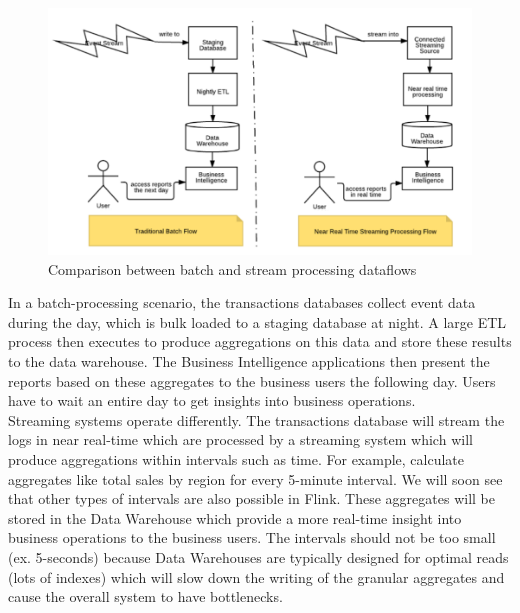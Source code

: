 				\begin{figure}[h!]
					\centering
					\includegraphics[scale=0.5]{graphics/BatchStream.PNG} 
					\caption{ Comparison between batch and stream processing dataflows \cite{a:Flink}} \label{flink} 
				\end{figure}
In a batch-processing scenario, the transactions databases collect event data during the day, which is bulk loaded to a staging database at night. A large ETL process then executes to produce aggregations on this data and store these results to the data warehouse. The Business Intelligence applications then present the reports based on  these aggregates to the business users the following day. Users have to wait an entire day to get insights into business 
operations.\\
Streaming systems operate differently. The transactions database will stream the logs in near real-time which are processed by a streaming system which will produce aggregations within intervals such as time. For example, calculate aggregates like total sales by region for every 5-minute interval. We will soon see that other types of intervals 
are also possible in Flink. These aggregates will be stored in the Data Warehouse which provide a more real-time insight into business operations to the business users. The intervals should not be too small (ex. 5-seconds) because Data Warehouses are typically designed for optimal reads (lots of indexes) which will slow down the writing of the granular aggregates and cause the overall system to have bottlenecks.				

